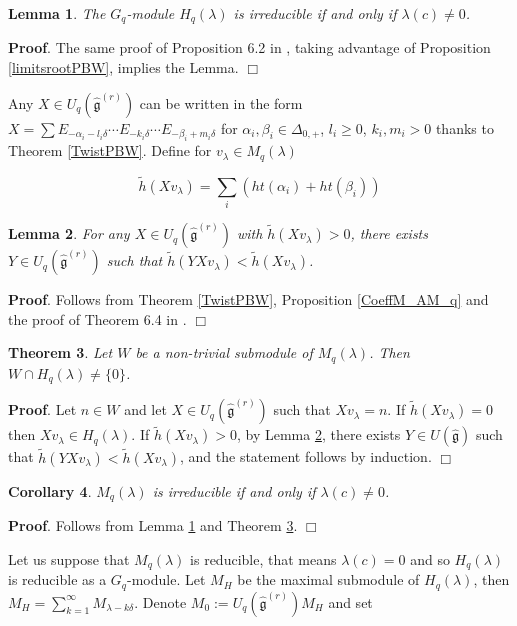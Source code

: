 \documentclass[12pt]{amsart}
\newtheorem{thm}{Theorem}[section]
\newtheorem{lem}[thm]{Lemma}
\newtheorem{cor}[thm]{Corollary}
\numberwithin{equation}{section}
\newcommand{\dem }{\noindent\textbf{Proof}. }
\newcommand{\findem }{\hfill $\Box$ \vskip0.5cm }
\newcommand{\g}{\ensuremath{\mathfrak{g}}}
\begin{document}
\begin{lem}\label{lemirrHq}
    The $G_q$-module $H_q(\lambda)$ is irreducible if and only if $\lambda(c) \neq 0$.
\end{lem}

\dem The same proof of Proposition 6.2 in \cite{FGM}, taking advantage of Proposition \ref{limitsrootPBW}, implies the Lemma.
\findem

Any $X \in U_q(\hat{\g}^{(r)})$ can be written in the form $X = \sum E_{-\alpha_i-l_i\delta} \cdots E_{-k_i\delta} \cdots E_{-\beta_i + m_i\delta}$ for $\alpha_i, \beta_i \in \Delta_{0,+}$, $l_i\geq 0$, $k_i, m_i>0$ thanks to Theorem \ref{TwistPBW}. Define for $v_\lambda \in M_q(\lambda)$

$$ \tilde{h}(Xv_\lambda) = \sum_{i}( ht(\alpha_i) + ht(\beta_i)) $$

\begin{lem}\label{AuxLem}
    For any $X \in U_q(\hat{\g}^{(r)})$ with $\tilde{h}(Xv_\lambda)>0$, there exists $Y \in U_q(\hat{\g}^{(r)})$ such that $\tilde{h}(YXv_\lambda) < \tilde{h}(Xv_\lambda)$.
\end{lem}

\dem Follows from Theorem \ref{TwistPBW}, Proposition \ref{CoeffM_AM_q} and the proof of Theorem 6.4 in \cite{FGM}.
\findem

\begin{thm}\label{Intersection}
    Let $W$ be a non-trivial submodule of $M_q(\lambda)$. Then $W\cap H_q(\lambda) \neq \{0\}$.
\end{thm}

\dem Let $n \in W$ and let $X \in U_q(\hat{\g}^{(r)})$ such that $Xv_\lambda = n$. If $\tilde{h}(Xv_\lambda) = 0$ then $Xv_\lambda \in H_q(\lambda)$. If $\tilde{h}(Xv_\lambda) >0$, by Lemma \ref{AuxLem}, there exists $Y \in U(\hat{\g})$ such that $\tilde{h}(YXv_\lambda) < \tilde{h}(Xv_\lambda)$, and the statement follows by induction. 
\findem


\begin{cor}
    $M_q(\lambda)$ is irreducible if and only if $\lambda(c)\neq0$. 
\end{cor} 

\dem Follows from Lemma \ref{lemirrHq} and Theorem \ref{Intersection}.
\findem 

Let us suppose that $M_q(\lambda)$ is reducible, that means $\lambda(c)=0$ and so $H_q(\lambda)$ is reducible as a $G_q$-module. Let $M_H$ be the maximal submodule of $H_q(\lambda)$, then $M_H = \sum_{k=1}^{\infty} M_{\lambda - k\delta}$. Denote $M_0 := U_q(\hat{\g}^{(r)})M_H$ and set 
\end{document}
